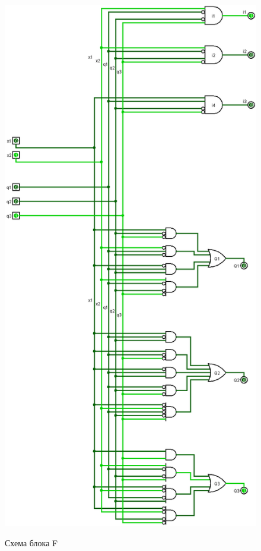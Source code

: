 \documentclass[10pt,a4paper,final]{article} %
\begin{document}
\begin{figure}[htpb]
	\centering
	\includegraphics[scale=0.4]{logisim/img/F.png}
	\label{F-block} 
	\caption{Схема блока F}
\end{figure}
\end{document}
